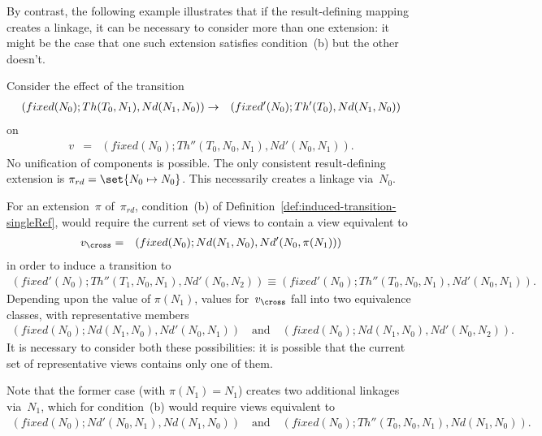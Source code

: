 By contrast, the following example illustrates that if the result-defining
mapping creates a linkage, it can be necessary to consider more than one
extension: it might be the case that one such extension satisfies
condition~(b) but the other doesn't.
%
\begin{example}
Consider the effect of the transition
\begin{eqnarray*}
(fixed(N_0); Th(T_0,N_1), Nd(N_1,N_0)) & \stackrel{}\rightarrow &
 (fixed'(N_0); Th'(T_0), Nd(N_1,N_0))
\end{eqnarray*}
on
\begin{eqnarray*}
v & = & (fixed(N_0); Th''(T_0,N_0,N_1), Nd'(N_0,N_1)).
\end{eqnarray*}
%
No unification of components is possible.  The only consistent result-defining
extension is $\pi_{rd} = \set{{N_0 \mapsto N_0}}$.  This necessarily creates a
linkage via~$N_0$.

For an extension~$\pi$ of~$\pi_{rd}$, condition~(b) of
Definition~\ref{def:induced-transition-singleRef}, would require the current
set of views to contain a view equivalent to
%
\begin{eqnarray*}
v_\cross & = & (fixed(N_0); Nd(N_1,N_0), Nd'(N_0,\pi(N_1)))
\end{eqnarray*}
in order to induce a transition to
\[
\begin{align}
(fixed'(N_0); Th''(T_1,N_0,N_1),  Nd'(N_0,N_2)) \equiv 
 (fixed'(N_0); Th''(T_0,N_0,N_1), Nd'(N_0,N_1)).
\end{align}
\]
Depending upon the value of $\pi(N_1)$, values for~$v_\cross$ fall into two
equivalence classes, with representative members
\[
\begin{align}
(fixed(N_0); Nd(N_1,N_0), Nd'(N_0,N_1)) \quad\mbox{and}\quad
(fixed(N_0); Nd(N_1,N_0), Nd'(N_0,N_2)).
\end{align}
\]
It is necessary to consider both these possibilities: it is possible that the
current set of representative views contains only one of them.

Note that the former case (with $\pi(N_1) = N_1$) creates two additional
linkages via~$N_1$, which for condition~(b) would require views equivalent to
\[
\begin{array}{c}
(fixed(N_0); Nd'(N_0,N_1), Nd(N_1,N_0)) \quad\mbox{and}\quad
(fixed(N_0);Th''(T_0,N_0,N_1),Nd(N_1,N_0)).
\end{array}
\]
\end{example}


